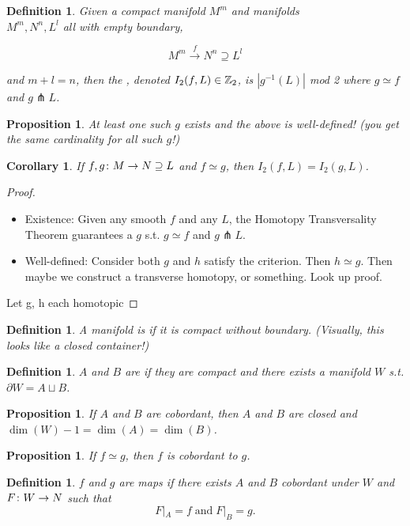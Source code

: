 \documentclass[11pt]{amsbook}
\theoremstyle{mystyle} %
\newtheorem{defi}[thm]{Definition}
\newtheorem{coro}[thm]{Corollary}
\newtheorem{propo}[thm]{Proposition}
\numberwithin{thm}{section}
\newcommand{\homotopic}{\simeq}
\renewcommand{\d}{\partial}
\newcommand{\transverse}{\pitchfork}
\begin{document}
\begin{defi}
	Given a compact manifold $M^m$ and manifolds \\$M^m, N^n, L^l$ all with empty boundary,

	$$M^m \overset{f}{\to} N^n \supseteq L^l$$

	and $m + l = n$, then the , denoted $I_2(f, L) \in {\mathbb Z}_2$, is $|g^{-1}(L)|$ mod 2 where $g \homotopic f$ and $g \transverse L$.
\end{defi}
\begin{propo}
	At least one such $g$ exists and the above is well-defined!  (you get the same cardinality for all such $g$!)
\end{propo}
\begin{coro}
	If $f,g\colon M \to N \supseteq L$ and $f \homotopic g$, then $I_2(f, L) = I_2(g, L)$.
\end{coro}
\begin{proof}
	\begin{itemize}
		\item Existence: Given any smooth $f$ and any $L$, the Homotopy Transversality Theorem guarantees a $g$ s.t. $g \homotopic f$ and $g \transverse L$.
		\item Well-defined: Consider both $g$ and $h$ satisfy the criterion.  Then $h \homotopic g$.  Then maybe we construct a transverse homotopy, or something.  Look up proof.
	\end{itemize}
		Let g, h each homotopic
\end{proof}
\begin{defi}
	A manifold is  if it is compact without boundary.  (Visually, this looks like a closed container!)
\end{defi}
\begin{defi}
	$A$ and $B$ are  if they are compact and there exists a manifold $W$ s.t. $\d W = A \sqcup B$.
\end{defi}
\begin{propo}
	If $A$ and $B$ are cobordant, then $A$ and $B$ are closed and $\dim(W)-1 = \dim(A) = \dim(B)$.
\end{propo}
\begin{propo}
	If $f \homotopic g$, then $f$ is cobordant to $g$.
\end{propo}
\begin{defi}
	$f$ and $g$ are  maps if there exists $A$ and $B$ cobordant under $W$ and $F\colon W \to N$ such that
	$$F|_A = f \;\text{and}\; F|_B = g.$$
\end{defi}
\end{document}
